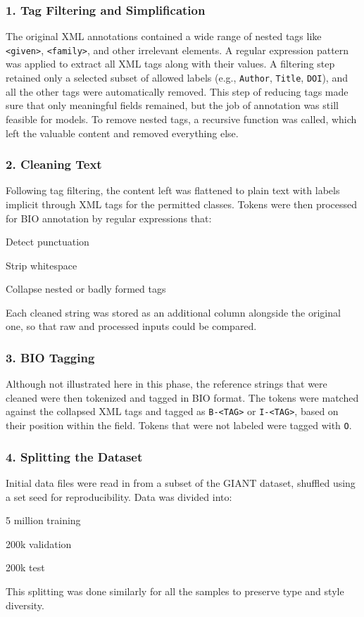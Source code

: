 \subsubsection{1. Tag Filtering and Simplification}
The original XML annotations contained a wide range of nested tags like \texttt{<given>}, \texttt{<family>}, and other irrelevant elements. A regular expression pattern was applied to extract all XML tags along with their values. A filtering step retained only a selected subset of allowed labels (e.g., \texttt{Author}, \texttt{Title}, \texttt{DOI}), and all the other tags were automatically removed.
This step of reducing tags made sure that only meaningful fields remained, but the job of annotation was still feasible for models. To remove nested tags, a recursive function was called, which left the valuable content and removed everything else.
\subsubsection{2. Cleaning Text}
Following tag filtering, the content left was flattened to plain text with labels implicit through XML tags for the permitted classes. Tokens were then processed for BIO annotation by regular expressions that:
\begin{compactitem}
\item Detect punctuation
\item Strip whitespace
\item Collapse nested or badly formed tags
\end{compactitem}
Each cleaned string was stored as an additional column alongside the original one, so that raw and processed inputs could be compared. 
\subsubsection{3. BIO Tagging}
Although not illustrated here in this phase, the reference strings that were cleaned were then tokenized and tagged in BIO format. The tokens were matched against the collapsed XML tags and tagged as \texttt{B-<TAG>} or \texttt{I-<TAG>}, based on their position within the field. Tokens that were not labeled were tagged with \texttt{O}.
\subsubsection{4. Splitting the Dataset}
Initial data files were read in from a subset of the GIANT dataset, shuffled using a set seed for reproducibility. Data was divided into:
\begin{compactitem}
\item 5 million training
\item 200k validation
\item 200k test
\end{compactitem}
This splitting was done similarly for all the samples to preserve type and style diversity.

